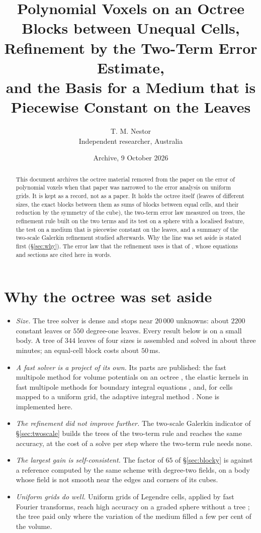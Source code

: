 \documentclass[11pt,a4paper]{article}
\title{\bfseries Polynomial Voxels on an Octree\\[4pt]
\large Blocks between Unequal Cells, Refinement by the Two-Term Error Estimate,\\
and the Basis for a Medium that is Piecewise Constant on the Leaves}
\author{T. M. Nestor\\[2pt]\small Independent researcher, Australia}
\date{Archive, 9 October 2026}
\begin{document}
\maketitle

\begin{abstract}
\noindent
This document archives the octree material removed from the paper on the error of polynomial voxels
\citep{NestorError2026} when that paper was narrowed to the error analysis on uniform grids. It is kept
as a record, not as a paper. It holds the octree itself (leaves of different sizes, the exact blocks
between them as sums of blocks between equal cells, and their reduction by the symmetry of the cube), the
two-term error law measured on trees, the refinement rule built on the two terms and its test on a sphere
with a localised feature, the test on a medium that is piecewise constant on the leaves, and a summary of
the two-scale Galerkin refinement studied afterwards. Why the line was set aside is stated first
(\S\ref{sec:why}). The error law that the refinement uses is that of \citet{NestorError2026}, whose
equations and sections are cited here in words.
\end{abstract}

\section{Why the octree was set aside}\label{sec:why}

\begin{itemize}
\item \emph{Size.} The tree solver is dense and stops near $20\,000$ unknowns: about $2200$ constant
leaves or $550$ degree-one leaves. Every result below is on a small body. A tree of $344$ leaves of four
sizes is assembled and solved in about three minutes; an equal-cell block costs about $50$\,ms.
\item \emph{A fast solver is a project of its own.} Its parts are published: the fast multipole method
for volume potentials on an octree \citep{Malhotra2016}, the elastic kernels in fast multipole methods for
boundary integral equations \citep{Fujiwara2000,Chaillat2008}, and, for cells mapped to a uniform grid, the
adaptive integral method \citep{Bleszynski1996}. None is implemented here.
\item \emph{The refinement did not improve further.} The two-scale Galerkin indicator of
\S\ref{sec:twoscale} builds the trees of the two-term rule and reaches the same accuracy, at the cost of a
solve per step where the two-term rule needs none.
\item \emph{The largest gain is self-consistent.} The factor of $65$ of \S\ref{sec:blocky} is against a
reference computed by the same scheme with degree-two fields, on a body whose field is not smooth near
the edges and corners of its cubes.
\item \emph{Uniform grids do well.} Uniform grids of Legendre cells, applied by fast Fourier transforms,
reach high accuracy on a graded sphere without a tree \citep{NestorCoupling2026}; the tree paid only where
the variation of the medium filled a few per cent of the volume.
\end{itemize}
\end{document}
